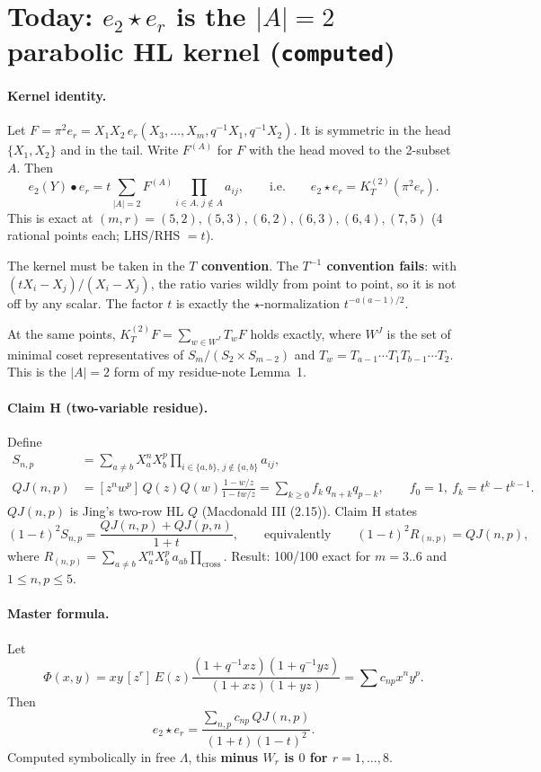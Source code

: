 \documentclass[11pt]{article}
\newcommand{\st}{\star}
\newcommand{\grade}[1]{\texttt{#1}}
\begin{document}
\section{Today: \texorpdfstring{$e_2\st e_r$}{e2*er} is the \texorpdfstring{$|A|=2$}{|A|=2} parabolic HL kernel (\grade{computed})}

\paragraph{Kernel identity.} Let $F=\pi^2e_r=X_1X_2\,e_r(X_3,\dots,X_m,q^{-1}X_1,q^{-1}X_2)$. It is symmetric in the head $\{X_1,X_2\}$ and in the tail. Write $F^{(A)}$ for $F$ with the head moved to the 2-subset $A$. Then
\[
e_2(Y)\bullet e_r=t\sum_{|A|=2}F^{(A)}\prod_{i\in A,\,j\notin A}a_{ij},
\qquad\text{i.e.}\qquad
e_2\st e_r=K^{(2)}_T(\pi^2e_r).
\]
This is exact at $(m,r)=(5,2),(5,3),(6,2),(6,3),(6,4),(7,5)$ (4 rational points each; LHS/RHS $=t$).

The kernel must be taken in the \textbf{$T$ convention}. The \textbf{$T^{-1}$ convention fails}: with $(tX_i-X_j)/(X_i-X_j)$, the ratio varies wildly from point to point, so it is not off by any scalar. The factor $t$ is exactly the $\st$-normalization $t^{-a(a-1)/2}$.

At the same points, $K^{(2)}_TF=\sum_{w\in W^J}T_wF$ holds exactly, where $W^J$ is the set of minimal coset representatives of $S_m/(S_2\times S_{m-2})$ and $T_w=T_{a-1}\cdots T_1T_{b-1}\cdots T_2$. This is the $|A|=2$ form of my residue-note Lemma~1.

\paragraph{Claim H (two-variable residue).} Define
\begin{align*}
S_{n,p}&=\sum_{a\ne b}X_a^nX_b^p\prod_{i\in\{a,b\},\,j\notin\{a,b\}}a_{ij},\\
QJ(n,p)&=[z^nw^p]\,Q(z)Q(w)\frac{1-w/z}{1-tw/z}=\sum_{k\ge0}f_k\,q_{n+k}q_{p-k},\qquad f_0=1,\ f_k=t^k-t^{k-1}.
\end{align*}
$QJ(n,p)$ is Jing's two-row HL $Q$ (Macdonald III (2.15)). Claim H states
\[
(1-t)^2S_{n,p}=\frac{QJ(n,p)+QJ(p,n)}{1+t},
\qquad\text{equivalently}\qquad
(1-t)^2R_{(n,p)}=QJ(n,p),
\]
where $R_{(n,p)}=\sum_{a\neq b}X_a^nX_b^p\,a_{ab}\prod_{\mathrm{cross}}$. Result: 100/100 exact for $m=3..6$ and $1\le n,p\le5$.

\paragraph{Master formula.} Let
\[
\Phi(x,y)=xy\,[z^r]\,E(z)\frac{(1+q^{-1}xz)(1+q^{-1}yz)}{(1+xz)(1+yz)}=\sum c_{np}x^ny^p.
\]
Then
\[
e_2\st e_r=\frac{\sum_{n,p}c_{np}\,QJ(n,p)}{(1+t)(1-t)^2}.
\]
Computed symbolically in free $\Lambda$, this \textbf{minus $W_r$ is $0$ for $r=1,\dots,8$}.
\end{document}
